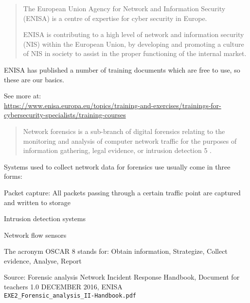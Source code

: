 \documentclass[Screen16to9,17pt]{foils}
\begin{document}

\begin{quote}
  The European Union Agency for Network and Information Security (ENISA) is a centre of expertise for cyber security in Europe.

ENISA is contributing to a high level of network and information security (NIS) within the European Union, by developing and promoting a culture of NIS in society to assist in the proper functioning of the internal market.
\end{quote}


ENISA has published a number of training documents which are free to use, so these are our basics.

See more at:\\{\footnotesize
\url{https://www.enisa.europa.eu/topics/training-and-exercises/trainings-for-cybersecurity-specialists/training-courses}}


\begin{quote}
Network forensics is a sub-branch of digital forensics relating to the monitoring and analysis of computer
network traffic for the purposes of information gathering, legal evidence, or intrusion detection 5 .
\end{quote}

\begin{list1}
\item Systems used to collect network data for forensics use usually come in three forms:
\begin{list2}
\item Packet capture: All packets passing through a certain traffic point are captured and written to storage
\item Intrusion detection systems
\item Network flow sensors
\end{list2}
\end{list1}

The acronym OSCAR 8 stands for: Obtain information,
Strategize,
Collect evidence,
Analyse,
Report

Source: Forensic analysis Network Incident Response Handbook, Document for teachers 1.0 DECEMBER 2016, ENISA\\
\verb+EXE2_Forensic_analysis_II-Handbook.pdf+


\end{document}
